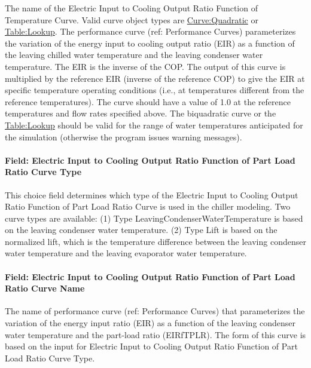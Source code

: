 The name of the Electric Input to Cooling Output Ratio Function of Temperature Curve. Valid curve object types are \hyperref[curvequadratic]{Curve:Quadratic} or \hyperref[tablelookup]{Table:Lookup}. The performance curve (ref: Performance Curves) parameterizes the variation of the energy input to cooling output ratio (EIR) as a function of the leaving chilled water temperature and the leaving condenser water temperature. The EIR is the inverse of the COP. The output of this curve is multiplied by the reference EIR (inverse of the reference COP) to give the EIR at specific temperature operating conditions (i.e., at temperatures different from the reference temperatures). The curve should have a value of 1.0 at the reference temperatures and flow rates specified above. The biquadratic curve or the \hyperref[tablelookup]{Table:Lookup} should be valid for the range of water temperatures anticipated for the simulation (otherwise the program issues warning messages).

\paragraph{Field: Electric Input to Cooling Output Ratio Function of Part Load Ratio Curve Type}\label{field-electric-input-to-cooling-output-ratio-function-of-part-load-ratio-curve-type}

This choice field determines which type of the Electric Input to Cooling Output Ratio Function of Part Load Ratio Curve is used in the chiller modeling. Two curve types are available: (1) Type LeavingCondenserWaterTemperature is based on the leaving condenser water temperature. (2) Type Lift is based on the normalized lift, which is the temperature difference between the leaving condenser water temperature and the leaving evaporator water temperature.

\paragraph{Field: Electric Input to Cooling Output Ratio Function of Part Load Ratio Curve Name}\label{field-electric-input-to-cooling-output-ratio-function-of-part-load-ratio-curve-name-1}

The name of performance curve (ref: Performance Curves) that parameterizes the variation of the energy input ratio (EIR) as a function of the leaving condenser water temperature and the part-load ratio (EIRfTPLR). The form of this curve is based on the input for Electric Input to Cooling Output Ratio Function of Part Load Ratio Curve Type.

